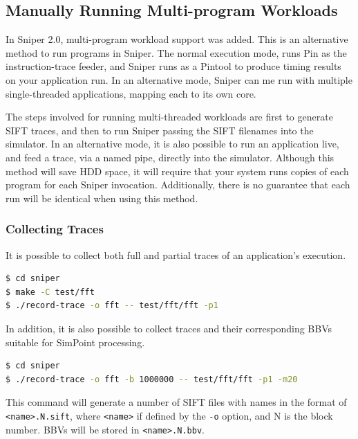 \documentclass[a4paper,11pt,titlepage]{article}
\newcommand{\cmd}[1]{{\tt #1}}
\begin{document}
\subsection{Manually Running Multi-program Workloads}

In Sniper 2.0, multi-program workload support was added.  This is an alternative method to run programs
in Sniper.  The normal execution mode, runs Pin as the instruction-trace feeder, and Sniper runs as a Pintool
to produce timing results on your application run.  In an alternative mode, Sniper can me run with multiple
single-threaded applications, mapping each to its own core.

The steps involved for running multi-threaded workloads are first to generate SIFT traces, and then to
run Sniper passing the SIFT filenames into the simulator.  In an alternative mode, it is also possible to
run an application live, and feed a trace, via a named pipe, directly into the simulator.  Although this method
will save HDD space, it will require that your system runs copies of each program for each Sniper invocation.
Additionally, there is no guarantee that each run will be identical when using this method.

\subsubsection{Collecting Traces}

It is possible to collect both full and partial traces of an application's execution.

\begin{lstlisting}[label=lst:collecting-traces,caption=Collecting Traces,rulecolor=\color{DarkSlateBlue},language=Bash,deletekeywords=test]
$ cd sniper
$ make -C test/fft
$ ./record-trace -o fft -- test/fft/fft -p1
\end{lstlisting}

In addition, it is also possible to collect traces and their corresponding BBVs suitable for SimPoint processing.

\begin{lstlisting}[label=lst:collecting-simpoint-traces,caption=SimPoint Trace Collection,rulecolor=\color{DarkSlateBlue},language=Bash,deletekeywords=test]
$ cd sniper
$ ./record-trace -o fft -b 1000000 -- test/fft/fft -p1 -m20
\end{lstlisting}

This command will generate a number of SIFT files with names in the format of \cmd{<name>.N.sift}, where \cmd{<name>}
if defined by the \cmd{-o} option, and N is the block number.  BBVs will be stored in \cmd{<name>.N.bbv}.
\end{document}
